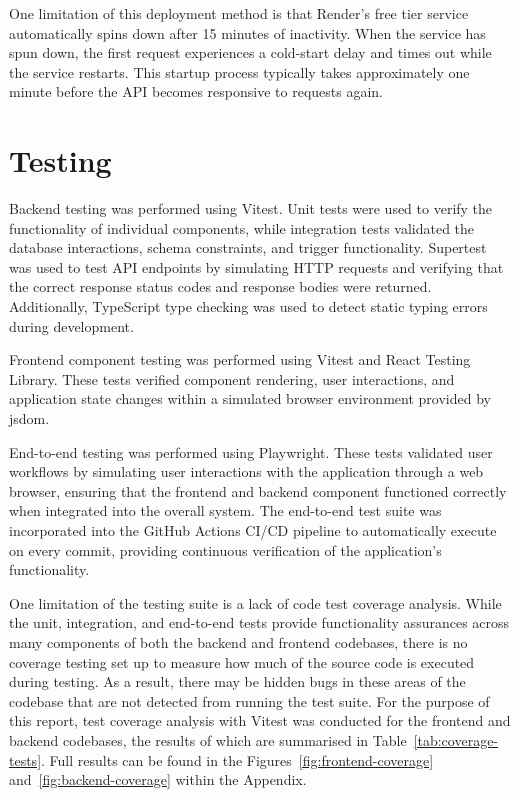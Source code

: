 \documentclass{vgtc}                          %
\begin{document}
One limitation of this deployment method is that Render's free tier service automatically spins down after 15 minutes of inactivity. When the service has spun down, the first request experiences a cold-start delay and times out while the service restarts. This startup process typically takes approximately one minute before the API becomes responsive to requests again.

\section{Testing}

Backend testing was performed using Vitest. Unit tests were used to verify the functionality of individual components, while integration tests validated the database interactions, schema constraints, and trigger functionality.
Supertest was used to test API endpoints by simulating HTTP requests and verifying that the correct response status codes and response bodies were returned.
Additionally, TypeScript type checking was used to detect static typing errors during development.

Frontend component testing was performed using Vitest and React Testing Library. These tests verified component rendering, user interactions, and application state changes within a simulated browser environment provided by jsdom.

End-to-end testing was performed using Playwright. These tests validated user workflows by simulating user interactions with the application through a web browser, ensuring that the frontend and backend component functioned correctly when integrated into the overall system. The end-to-end test suite was incorporated into the GitHub Actions CI/CD pipeline to automatically execute on every commit, providing continuous verification of the application's functionality.

One limitation of the testing suite is a lack of code test coverage analysis. While the unit, integration, and end-to-end tests provide functionality assurances across many components of both the backend and frontend codebases, there is no coverage testing set up to measure how much of the source code is executed during testing. As a result, there may be hidden bugs in these areas of the codebase that are not detected from running the test suite. 
For the purpose of this report, test coverage analysis with Vitest was conducted for the frontend and backend codebases, the results of which are summarised in Table~\ref{tab:coverage-tests}. Full results can be found in the Figures~\ref{fig:frontend-coverage} and~\ref{fig:backend-coverage} within the Appendix.
\end{document}
